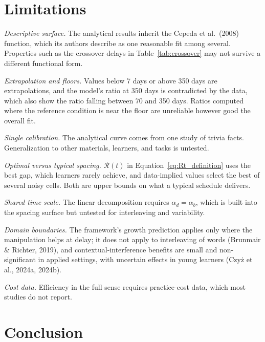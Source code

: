 \documentclass[10pt,twocolumn]{article}
\newcommand{\effr}{\mathcal{R}}
\begin{document}
\section{Limitations}
\label{sec:limitations}

\textit{Descriptive surface.} The analytical results inherit the Cepeda et al.\ (2008) function, which its authors describe as one reasonable fit among several. Properties such as the crossover delays in Table~\ref{tab:crossover} may not survive a different functional form.

\textit{Extrapolation and floors.} Values below 7 days or above 350 days are extrapolations, and the model's ratio at 350 days is contradicted by the data, which also show the ratio falling between 70 and 350 days. Ratios computed where the reference condition is near the floor are unreliable however good the overall fit.

\textit{Single calibration.} The analytical curve comes from one study of trivia facts. Generalization to other materials, learners, and tasks is untested.

\textit{Optimal versus typical spacing.} $\effr(t)$ in Equation~\ref{eq:Rt_definition} uses the best gap, which learners rarely achieve, and data-implied values select the best of several noisy cells. Both are upper bounds on what a typical schedule delivers.

\textit{Shared time scale.} The linear decomposition requires $\alpha_d = \alpha_b$, which is built into the spacing surface but untested for interleaving and variability.

\textit{Domain boundaries.} The framework's growth prediction applies only where the manipulation helps at delay; it does not apply to interleaving of words (Brunmair \& Richter, 2019), and contextual-interference benefits are small and non-significant in applied settings, with uncertain effects in young learners (Czy\.{z} et al., 2024a, 2024b).

\textit{Cost data.} Efficiency in the full sense requires practice-cost data, which most studies do not report.

\section{Conclusion}
\end{document}
